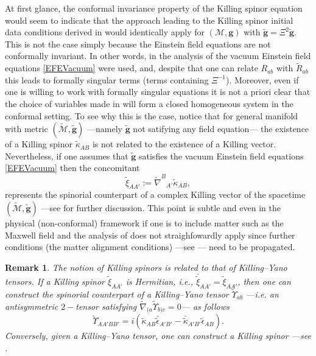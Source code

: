 \documentclass[10pt,a4paper]{article}
\theoremstyle{plain}
\newtheorem{remark}{Remark}
\def\bmg{{\bm g}}
\begin{document}
At first glance, the conformal invariance property of the Killing
spinor equation would seem to indicate that the approach leading to
the Killing spinor initial data conditions derived in \cite{GarVal08c}
would identically apply for $(\mathcal{M},\bmg)$ with
$\tilde\bmg=\Xi^2\tilde{\bmg}$. This is not the case simply because
the Einstein field equations are not conformally invariant.  In other
words, in the analysis of \cite{GarVal08c} the vacuum Einstein field
equations \eqref{EFEVacuum} were used, and, despite that one can
relate $R_{ab}$ with $\tilde{R}_{ab}$ this leads to formally singular
terms (terms containing $\Xi^{-1}$). Moreover, even if one is willing
to work with formally singular equations it is not a priori clear that
the choice of variables made in \cite{GarVal08c} will form a closed
homogeneous system in the conformal setting.  To see why this is the
case, notice that for general manifold with metric
$(\tilde{\mathcal{M}},\tilde{\bmg})$ ---namely $\tilde{\bmg}$ not
satifying any field equation--- the existence of a Killing spinor
$\tilde{\kappa}_{AB}$ is not related to the existence of a
Killing vector.
Nevertheless, if one assumes that $\tilde{\bmg}$
satisfies the vacuum Einstein field equations \eqref{EFEVacuum} then
the concomitant
\begin{equation*}
\tilde{\xi}_{AA'} := \tilde{\nabla}^{B}{}_{A'}\tilde{\kappa}_{AB},
\end{equation*}
represents the spinorial counterpart of a complex Killing vector of
the spacetime $(\tilde{\mathcal{M}},\tilde{\bmg})$ ---see
\cite{GarVal08c} for further discussion. This point is subtle and even
in the physical (non-conformal) framework if one is to include matter
such as the Maxwell field and the analysis of \cite{GarVal08c} does
not straighfowardly apply since further conditions (the matter
alignment conditions) ---see \cite{ValCol16}--- need to be propagated.
\begin{remark}
  \emph{
  The notion of Killing spinors is related to that
  of Killing--Yano tensors. If a Killing spinor
$\tilde{\xi}_{AA'}$ is Hermitian, i.e.,
$\bar{\tilde{\xi}}_{AA'}=\tilde{\xi}_{AA'}$, then one can construct the
spinorial counterpart of a \emph{Killing--Yano tensor}
$\tilde{\Upsilon}_{ab}$ ---i.e. an antisymmetric $2-$tensor satisfying
$\tilde{\nabla}_{(a}\tilde{\Upsilon}_{b)c}=0$--- as follows
\[\tilde{\Upsilon}_{AA'BB'}=i(\tilde{\kappa}_{AB}\bar{\tilde{\epsilon}}_{A'B'}
-\bar{\tilde{\kappa}}_{A'B'}\tilde{\epsilon}_{AB}).\] Conversely,
given a Killing--Yano tensor, one can construct a Killing spinor
---see \cite{ValCol16,McLBer93,PenRin86}.}
\end{remark}
\medskip
\end{document}
